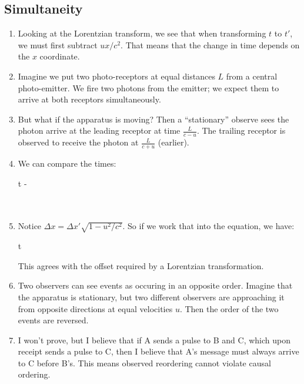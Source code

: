 \subsection{Simultaneity}

\begin{enumerate}

  \item Looking at the Lorentzian transform, we see that when
  transforming $t$ to $t'$, we must first subtract $ux/c^2$. That means
  that the change in time depends on the $x$ coordinate.

  \item Imagine we put two photo-receptors at equal distances $L$ from a
  central photo-emitter. We fire two photons from the emitter; we expect
  them to arrive at both receptors simultaneously.

  \item But what if the apparatus is moving? Then a ``stationary''
  observe sees the photon arrive at the leading receptor at time
  $\frac{L}{c - u}$. The trailing receptor is observed to receive the
  photon at $\frac{L}{c + u}$ (earlier).

  \item We can compare the times:

  \begin{nedqn}
    \Delta t
  \eqcol
    -
  \\
  \eqcol
  \\
  \eqcol
  \\
  \eqcol
  \end{nedqn}

  \item Notice $\Delta x = \Delta x' \sqrt{1 - u^2/c^2}$. So if we work
  that into the equation, we have:

  \begin{nedqn}
    \Delta t
  \eqcol
  \\
  \eqcol
  \end{nedqn}

  This agrees with the offset required by a Lorentzian transformation.

  \item Two observers can see events as occuring in an opposite order.
  Imagine that the apparatus is stationary, but two different observers
  are approaching it from opposite directions at equal velocities $u$.
  Then the order of the two events are reversed.

  \item I won't prove, but I believe that if A sends a pulse to B and C,
  which upon receipt sends a pulse to C, then I believe that A's message
  must always arrive to C before B's. This means observed reordering
  cannot violate causal ordering.

\end{enumerate}
